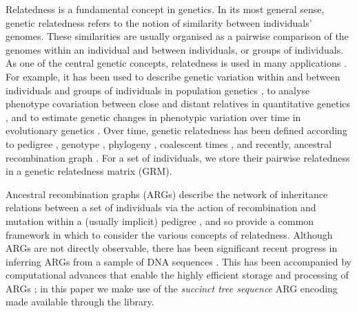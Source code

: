 

Relatedness is a fundamental concept in genetics.
%
In its most general sense, genetic relatedness refers to the notion of
similarity between individuals' genomes.
%
These similarities are usually organised as a pairwise comparison of the
genomes within an individual and between individuals, or groups of
individuals.
%
As one of the central genetic concepts, relatedness is used in many
applications \citep{weir2006genetic, speed2015relatedness}.
%
For example, it has been used to describe genetic variation within and between individuals
and groups of individuals in population genetics
\citep{crow2009introduction, charlesworth2010elements},
to analyse phenotype covariation between close and distant relatives in
quantitative genetics \citep{falconer1996introduction, lynch1998genetics},
and to estimate genetic changes in phenotypic variation over time in
evolutionary genetics \citep{walsh2018evolution, arnold2023evolutionary}.
%
Over time, genetic relatedness has been defined according to
pedigree \citep{fisher1919correlation, wright1922coefficients},
genotype \citep{cotterman1940calculus, malecot1948mathematiques, malecot1969mathemathics},
phylogeny \citep{felsenstein1985phylogenies,lynch1991methods},
coalescent times \citep{slatkin1991inbreeding}, and
recently, ancestral recombination graph \citep{tsambos2022efficient, fan2022genealogical, zhang2023biobank}.
%
%
For a set of individuals, we store their pairwise relatedness in a genetic relatedness matrix (GRM).
    
Ancestral recombination graphs (ARGs) 
describe the network of inheritance relations between a set of individuals
via the action of recombination and mutation within a (usually implicit) pedigree
\citep{brandt2024promise, lewanski2024era, wong2023general, nielsen2024inference},
and so provide a common framework in which to consider
the various concepts of relatedness.
%
Although ARGs are not directly observable,
there has been significant recent progress in inferring ARGs from a sample of DNA sequences
\citep{rasmussen2014genome,speidel2019method, kelleher2019inferring, zhang2023biobank, deng2024robust, gunnarsson2024scalable}.
%
This has been accompanied by computational advances that enable
the highly efficient storage and processing of ARGs
\citep{kelleher2016efficient, zhu2024variance, dehaas2024enabling};
in this paper we make use of the \textit{succinct tree sequence} 
ARG encoding
\citep{ralph2020efficiently, wong2023general}
made available through the \tskit{} library.


